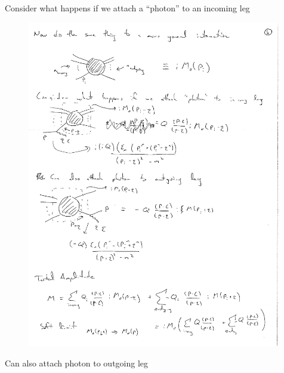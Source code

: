{Consider what happens if we attach a ``photon'' to an incoming leg

\begin{figure}[h]
\includegraphics[width=0.99\textwidth]{./incomingPhoton.pdf}
\end{figure}

\clearpage

Can also attach photon to outgoing leg

}
